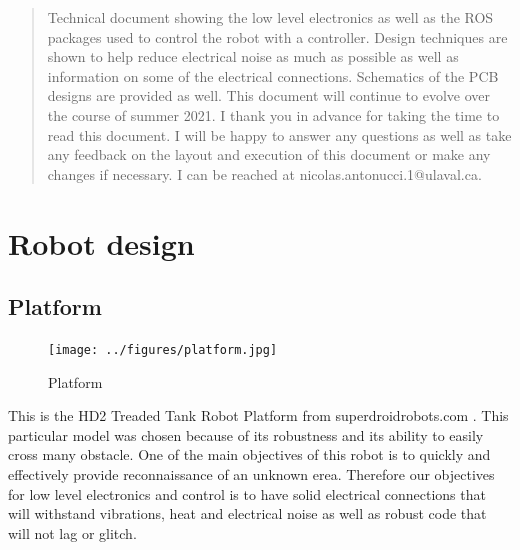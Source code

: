 \documentclass[12pt,letterpaper,oneside]{article}
\begin{document}

\thispagestyle{titlePage}

\begin{abstract}
Technical document showing the low level electronics as well as the ROS packages used to control the robot with a controller. Design techniques are shown to help reduce electrical noise as much as possible as well as information on some of the electrical connections. Schematics of the PCB designs are provided as well. This document will continue to evolve over the course of summer 2021. I thank you in advance for taking the time to read this document. I will be happy to answer any questions as well as take any feedback on the layout and execution of this document or make any changes if necessary. I can be reached at nicolas.antonucci.1@ulaval.ca.
\end{abstract}


\tableofcontents
\listoffigures

\newpage
\section{Robot design}

\subsection{Platform}

\begin{figure}
  \begin{center}
    \texttt{[image: ../figures/platform.jpg]}
  \end{center}
  \caption{Platform}
\end{figure}

This is the HD2 Treaded Tank Robot Platform from superdroidrobots.com \cite{superdroidrobots}. This particular model was chosen because of its robustness and its ability to easily cross many obstacle. One of the main objectives of this robot is to quickly and effectively provide reconnaissance of an unknown erea. Therefore our objectives for low level electronics and control is to have solid electrical connections that will withstand vibrations, heat and electrical noise as well as robust code that will not lag or glitch.\\
\end{document}
